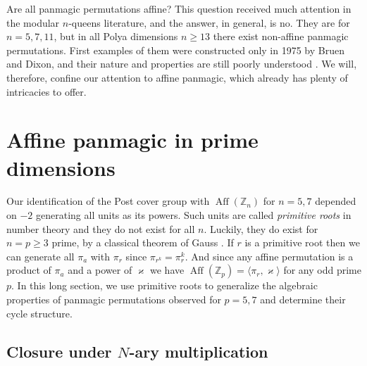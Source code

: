 \documentclass[11pt]{article}
\theoremstyle{plain}
\theoremstyle{definition}
\newcommand{\+}[1]{{#1}^\times}
\def\Aff{\operatorname{Aff}}
\def\Z{{\mathbb Z}}
\def\k{{\varkappa}}
\begin{document}
Are all panmagic permutations affine? This question received much attention in the modular $n$-queens literature, and the answer, in general, is no. They are for $n=5,7,11$, but in all Polya dimensions $n\geq13$ there exist non-affine panmagic permutations. First examples of them were constructed only in 1975 by Bruen and Dixon, and their nature and properties are still poorly understood \cite{BS2}. We will, therefore, confine our attention to affine panmagic, which already has plenty of intricacies to offer.  



\section{Affine panmagic in prime dimensions}

Our identification of the Post cover group with $\Aff(\Z_n)$ for $n=5,7$ depended on $-2$ generating all units as its powers. Such units are called {\it primitive roots} in number theory and they do not exist for all $n$. Luckily, they do exist for $n=p\geq3$ prime, by a classical theorem of Gauss \cite{Rosen}. If $r$ is a primitive root then we can generate all $\pi_a$ with $\pi_r$ since $\pi_{r^k}=\pi_r^k$. And since any affine permutation is a product of $\pi_a$ and a power of $\k$ we have $\Aff(\Z_p)=\langle\pi_r,\k\rangle$ for any odd prime $p$. In this long section, we use primitive roots to generalize the algebraic properties of panmagic permutations observed for $p=5,7$ and determine their cycle structure. 

\subsection{Closure under $N$-ary multiplication}
\end{document}
